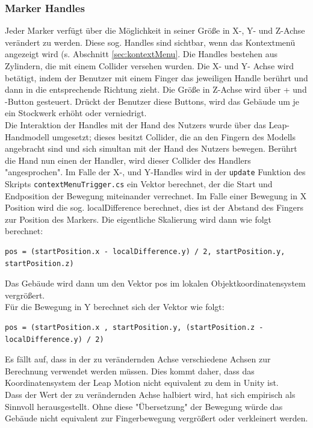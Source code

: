 \subsubsection{Marker Handles}\label{sec:markerHandles}
Jeder Marker verfügt über die Möglichkeit in seiner Größe in X-, Y- und Z-Achse verändert zu werden. Diese sog. \glqq Handles\grqq{} sind sichtbar, wenn das Kontextmenü angezeigt wird (s. Abschnitt  \ref{sec:kontextMenu}. Die Handles bestehen aus Zylindern, die mit einem Collider versehen wurden. Die X- und Y- Achse wird betätigt, indem der Benutzer mit einem Finger das jeweiligen Handle berührt und dann in die entsprechende Richtung zieht. Die Größe in Z-Achse wird über \glqq+\grqq{} und \glqq-\grqq Button gesteuert. Drückt der Benutzer diese Buttons, wird das Gebäude um je ein Stockwerk erhöht oder verniedrigt. \\

Die Interaktion der Handles mit der Hand des Nutzers wurde über das Leap- Handmodell umgesetzt; dieses besitzt Collider, die an den Fingern des Modells angebracht sind und sich simultan mit der Hand des Nutzers bewegen. Berührt die Hand nun einen der Handler, wird dieser Collider des Handlers "angesprochen". Im Falle der X-, und Y-Handles wird in der \texttt{update} Funktion des Skripts \texttt{contextMenuTrigger.cs} ein Vektor berechnet, der die Start und Endposition der Bewegung miteinander verrechnet. Im Falle einer Bewegung in X Position wird die sog. \glqq localDifference\grqq{} berechnet, dies ist der Abstand des Fingers zur Position des Markers. Die eigentliche Skalierung wird dann wie folgt berechnet:\\

 \begin{lstlisting}
pos = (startPosition.x - localDifference.y) / 2, startPosition.y, startPosition.z)
 \end{lstlisting}

Das Gebäude wird dann um den Vektor pos im lokalen Objektkoordinatensystem vergrößert.\\
Für die Bewegung in Y berechnet sich der Vektor wie folgt:

 \begin{lstlisting}
pos = (startPosition.x , startPosition.y, (startPosition.z - localDifference.y) / 2)
 \end{lstlisting}

Es fällt auf, dass in der zu verändernden Achse verschiedene Achsen zur Berechnung verwendet werden müssen. Dies kommt daher, dass das Koordinatensystem der Leap Motion nicht equivalent zu dem in Unity ist.\\
Dass der Wert der zu verändernden Achse halbiert wird, hat sich empirisch als Sinnvoll herausgestellt. Ohne diese "Übersetzung" der Bewegung würde das Gebäude nicht equivalent zur Fingerbewegung vergrößert oder verkleinert werden. 

